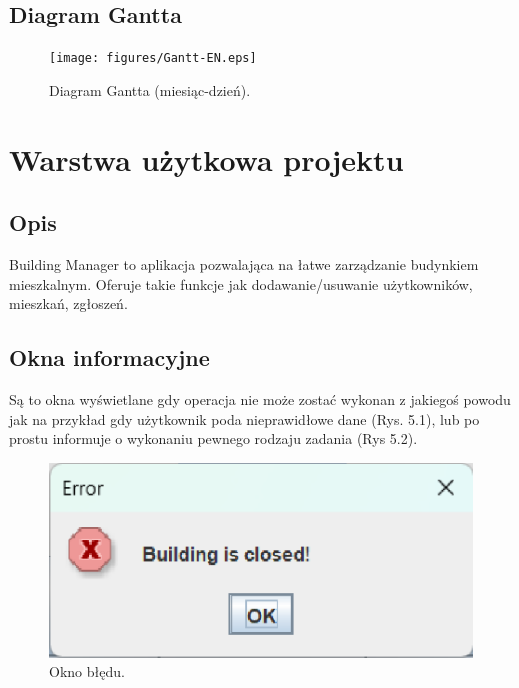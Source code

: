 \section{Diagram Gantta}
\begin{figure}[H]
    \center
    \texttt{[image: figures/Gantt-EN.eps]}\\
    \caption{Diagram Gantta \cite{Gan24} (miesiąc-dzień).\label{fig5}}
\end{figure}

\newpage
\chapter{Warstwa użytkowa projektu}
\section{Opis}
Building Manager to aplikacja pozwalająca na łatwe zarządzanie budynkiem mieszkalnym. Oferuje takie funkcje jak dodawanie/usuwanie użytkowników, 
mieszkań, zgłoszeń.

\section{Okna informacyjne}
Są to okna wyświetlane gdy operacja nie może zostać wykonan z jakiegoś powodu jak na przykład gdy użytkownik poda nieprawidłowe dane (Rys. 5.1), 
lub po prostu informuje o wykonaniu pewnego rodzaju zadania (Rys 5.2).

\begin{figure}[H]
    \centering
    \includegraphics[width=\textwidth,height=0.2\textheight,keepaspectratio]{figures/app-images/closed-building.eps}
    \caption{Okno błędu. \label{fig6}}
\end{figure}

